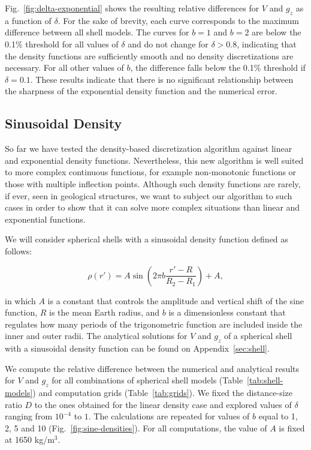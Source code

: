 \documentclass[extra, referee]{gji}
\begin{document}
Fig.~\ref{fig:delta-exponential} shows the resulting relative
differences for $V$ and $g_z$ as a function of $\delta$.
For the sake of brevity, each curve corresponds to the maximum difference between all
shell models.
The curves for $b=1$ and $b=2$ are below the 0.1\% threshold for all values of $\delta$
and do not change for $\delta > 0.8$, indicating that the density
functions are sufficiently smooth and no density discretizations are necessary.
For all other values of $b$, the difference falls below the 0.1\% threshold
if $\delta = 0.1$.
These results indicate that there is no significant relationship between the
sharpness of the exponential density function and the numerical error.


\subsection{Sinusoidal Density}

So far we have tested the density-based discretization algorithm against linear and
exponential density functions.
Nevertheless, this new algorithm is well suited to more complex continuous functions,
for example non-monotonic functions or those with multiple inflection points.
Although such density functions are rarely, if ever, seen in geological structures,
we want to subject our algorithm to such cases in order to show that it can solve more
complex situations than linear and exponential functions.

We will consider spherical shells with a sinusoidal density function defined as follows:

\begin{equation}
    \rho(r') = A \sin \left( 2 \pi b \frac{r' - R}{R_2 - R_1} \right) + A,
    \label{eq:density-sine}
\end{equation}

\noindent in which $A$ is a constant that controls the amplitude and vertical shift of
the sine function, $R$ is the mean Earth radius, and $b$ is a dimensionless constant
that regulates how many periods of the trigonometric function are included inside the
inner and outer radii.
The analytical solutions for $V$ and $g_z$ of a spherical shell with a sinusoidal
density function can be found on Appendix~\ref{sec:shell}.

We compute the relative difference between the numerical and analytical results for $V$
and $g_z$ for all combinations of spherical shell models (Table~\ref{tab:shell-models})
and computation grids (Table~\ref{tab:grids}).
We fixed the distance-size ratio $D$ to the ones obtained for the linear density case
and explored values of $\delta$ ranging from $10^{-4}$ to $1$.
The calculations are repeated for values of $b$ equal to 1, 2, 5 and 10
(Fig.~\ref{fig:sine-densities}).
For all computations, the value of $A$ is fixed at 1650 kg/m$^3$.
\end{document}
